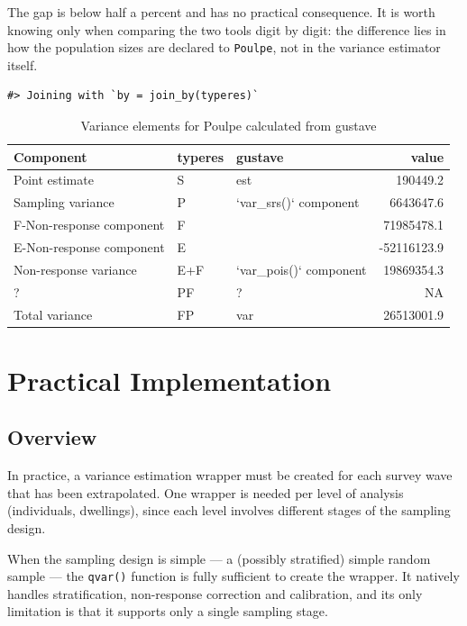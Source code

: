 \documentclass[
]{article}
\begin{document}
The gap is below half a percent and has no practical consequence. It is
worth knowing only when comparing the two tools digit by digit: the
difference lies in how the population sizes are declared to
\texttt{Poulpe}, not in the variance estimator itself.

\begin{verbatim}
#> Joining with `by = join_by(typeres)`
\end{verbatim}

\begin{table}[t]
\caption{\label{tab:unnamed-chunk-28}Variance elements for Poulpe calculated from gustave} 
\fontsize{12.0pt}{14.0pt}\selectfont
\begin{tabular*}{\linewidth}{@{\extracolsep{\fill}}lllr}
\toprule
Component & typeres & gustave & value \\ 
\midrule\addlinespace[2.5pt]
Point estimate & S & est & 190449.2 \\ 
Sampling variance & P & `var\_srs()` component & 6643647.6 \\ 
F-Non-response component & F &  & 71985478.1 \\ 
E-Non-response component & E &  & -52116123.9 \\ 
Non-response variance & E+F & `var\_pois()` component & 19869354.3 \\ 
? & PF & ? & NA \\ 
Total variance & FP & var & 26513001.9 \\ 
\bottomrule
\end{tabular*}
\end{table}

\section{Practical Implementation}\label{practical-implementation}

\subsection{Overview}\label{overview}

In practice, a variance estimation wrapper must be created for each
survey wave that has been extrapolated. One wrapper is needed per level
of analysis (individuals, dwellings), since each level involves
different stages of the sampling design.

When the sampling design is simple --- a (possibly stratified) simple
random sample --- the \texttt{qvar()} function is fully sufficient to
create the wrapper. It natively handles stratification, non-response
correction and calibration, and its only limitation is that it supports
only a single sampling stage.
\end{document}
